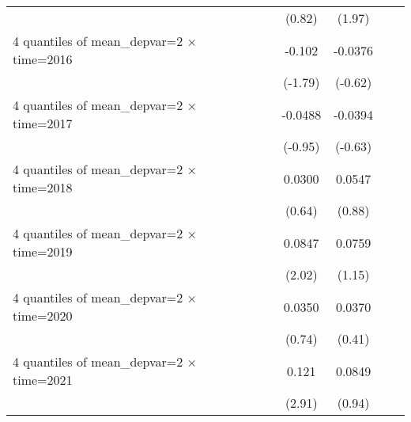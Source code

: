 \begin{table}[htbp]
\begin{tabular}{l*{6}{c}}
                    &                     &                     &      (0.82)         &      (1.97)         &                     &                     \\
[1em]
4 quantiles of mean\_depvar=2 $\times$ time=2016&                     &                     &      -0.102\sym{*}  &     -0.0376         &                     &                     \\
                    &                     &                     &     (-1.79)         &     (-0.62)         &                     &                     \\
[1em]
4 quantiles of mean\_depvar=2 $\times$ time=2017&                     &                     &     -0.0488         &     -0.0394         &                     &                     \\
                    &                     &                     &     (-0.95)         &     (-0.63)         &                     &                     \\
[1em]
4 quantiles of mean\_depvar=2 $\times$ time=2018&                     &                     &      0.0300         &      0.0547         &                     &                     \\
                    &                     &                     &      (0.64)         &      (0.88)         &                     &                     \\
[1em]
4 quantiles of mean\_depvar=2 $\times$ time=2019&                     &                     &      0.0847\sym{*}  &      0.0759         &                     &                     \\
                    &                     &                     &      (2.02)         &      (1.15)         &                     &                     \\
[1em]
4 quantiles of mean\_depvar=2 $\times$ time=2020&                     &                     &      0.0350         &      0.0370         &                     &                     \\
                    &                     &                     &      (0.74)         &      (0.41)         &                     &                     \\
[1em]
4 quantiles of mean\_depvar=2 $\times$ time=2021&                     &                     &       0.121\sym{***}&      0.0849         &                     &                     \\
                    &                     &                     &      (2.91)         &      (0.94)         &                     &                     \\

\end{tabular}
\end{table}
